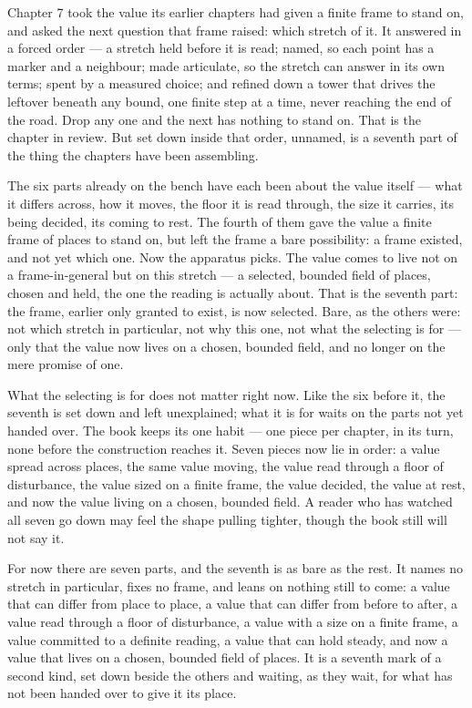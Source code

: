 Chapter 7 took the value its earlier chapters had given a finite frame to stand on, and asked the next question that frame raised: which stretch of it. It answered in a forced order --- a stretch held before it is read; named, so each point has a marker and a neighbour; made articulate, so the stretch can answer in its own terms; spent by a measured choice; and refined down a tower that drives the leftover beneath any bound, one finite step at a time, never reaching the end of the road. Drop any one and the next has nothing to stand on. That is the chapter in review. But set down inside that order, unnamed, is a seventh part of the thing the chapters have been assembling.

The six parts already on the bench have each been about the value itself --- what it differs across, how it moves, the floor it is read through, the size it carries, its being decided, its coming to rest. The fourth of them gave the value a finite frame of places to stand on, but left the frame a bare possibility: a frame existed, and not yet which one. Now the apparatus picks. The value comes to live not on a frame-in-general but on this stretch --- a selected, bounded field of places, chosen and held, the one the reading is actually about. That is the seventh part: the frame, earlier only granted to exist, is now selected. Bare, as the others were: not which stretch in particular, not why this one, not what the selecting is for --- only that the value now lives on a chosen, bounded field, and no longer on the mere promise of one.

What the selecting is for does not matter right now. Like the six before it, the seventh is set down and left unexplained; what it is for waits on the parts not yet handed over. The book keeps its one habit --- one piece per chapter, in its turn, none before the construction reaches it. Seven pieces now lie in order: a value spread across places, the same value moving, the value read through a floor of disturbance, the value sized on a finite frame, the value decided, the value at rest, and now the value living on a chosen, bounded field. A reader who has watched all seven go down may feel the shape pulling tighter, though the book still will not say it.

For now there are seven parts, and the seventh is as bare as the rest. It names no stretch in particular, fixes no frame, and leans on nothing still to come: a value that can differ from place to place, a value that can differ from before to after, a value read through a floor of disturbance, a value with a size on a finite frame, a value committed to a definite reading, a value that can hold steady, and now a value that lives on a chosen, bounded field of places. It is a seventh mark of a second kind, set down beside the others and waiting, as they wait, for what has not been handed over to give it its place.

